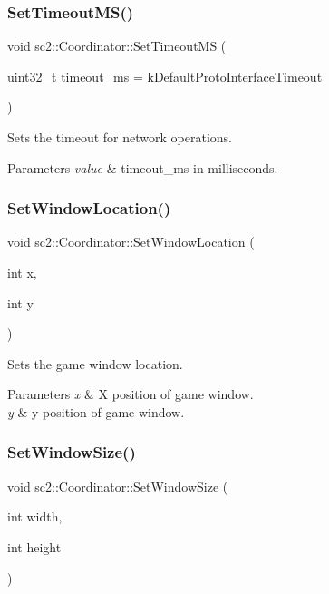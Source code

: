 \subsubsection{\texorpdfstring{Set\+Timeout\+M\+S()}{SetTimeoutMS()}}
{\footnotesize\ttfamily void sc2\+::\+Coordinator\+::\+Set\+Timeout\+MS (\begin{DoxyParamCaption}\item[{uint32\+\_\+t}]{timeout\+\_\+ms = {\ttfamily kDefaultProtoInterfaceTimeout} }\end{DoxyParamCaption})}

Sets the timeout for network operations. 
\begin{DoxyParams}{Parameters}
{\em value} & timeout\+\_\+ms in milliseconds. \\
\hline
\end{DoxyParams}
\mbox{\label{classsc2_1_1_coordinator_a6e372788e11c3916fdf1982eb2e55511}} 
\subsubsection{\texorpdfstring{Set\+Window\+Location()}{SetWindowLocation()}}
{\footnotesize\ttfamily void sc2\+::\+Coordinator\+::\+Set\+Window\+Location (\begin{DoxyParamCaption}\item[{int}]{x,  }\item[{int}]{y }\end{DoxyParamCaption})}

Sets the game window location. 
\begin{DoxyParams}{Parameters}
{\em x} & X position of game window. \\
\hline
{\em y} & y position of game window. \\
\hline
\end{DoxyParams}
\mbox{\label{classsc2_1_1_coordinator_a9b0eca71a6f7575f35d1dd5c3e5d73cf}} 
\subsubsection{\texorpdfstring{Set\+Window\+Size()}{SetWindowSize()}}
{\footnotesize\ttfamily void sc2\+::\+Coordinator\+::\+Set\+Window\+Size (\begin{DoxyParamCaption}\item[{int}]{width,  }\item[{int}]{height }\end{DoxyParamCaption})}

